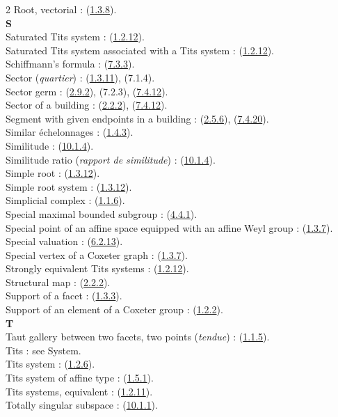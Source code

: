 \documentclass[12pt,a4paper,oneside,english]{smfart}
\newcommand{\btref}[1]{\hyperlink{bt:#1}{#1}}
\theoremstyle{definition}
\theoremstyle{bt}
\begin{document}
\begin{multicols}{2}
Root, vectorial : (\btref{1.3.8}).\\
\textbf{S}\\
Saturated Tits system : (\btref{1.2.12}).\\
Saturated Tits system associated with a Tits system : (\btref{1.2.12}).\\
Schiffmann's formula : (\btref{7.3.3}).\\
Sector (\emph{quartier}) : (\btref{1.3.11}), (7.1.4).\\
Sector germ : (\btref{2.9.2}), (7.2.3), (\btref{7.4.12}).\\
Sector of a building : (\btref{2.2.2}), (\btref{7.4.12}).\\
Segment with given endpoints in a building : (\btref{2.5.6}), (\btref{7.4.20}).\\
Similar échelonnages : (\btref{1.4.3}).\\
Similitude : (\btref{10.1.4}).\\
Similitude ratio (\emph{rapport de similitude}) : (\btref{10.1.4}).\\
Simple root : (\btref{1.3.12}).\\
Simple root system : (\btref{1.3.12}).\\
Simplicial complex : (\btref{1.1.6}).\\
Special maximal bounded subgroup : (\btref{4.4.1}).\\
Special point of an affine space equipped with an affine Weyl group : (\btref{1.3.7}).\\
Special valuation : (\btref{6.2.13}).\\
Special vertex of a Coxeter graph : (\btref{1.3.7}).\\
Strongly equivalent Tits systems : (\btref{1.2.12}).\\
Structural map : (\btref{2.2.2}).\\
Support of a facet : (\btref{1.3.3}).\\
Support of an element of a Coxeter group : (\btref{1.2.2}).\\
\textbf{T}\\
Taut gallery between two facets, two points (\emph{tendue}) : (\btref{1.1.5}).\\
Tits : see System.\\
Tits system : (\btref{1.2.6}).\\
Tits system of affine type : (\btref{1.5.1}).\\
Tits systems, equivalent : (\btref{1.2.11}).\\
Totally singular subspace : (\btref{10.1.1}).\\

\end{multicols}
\end{document}
